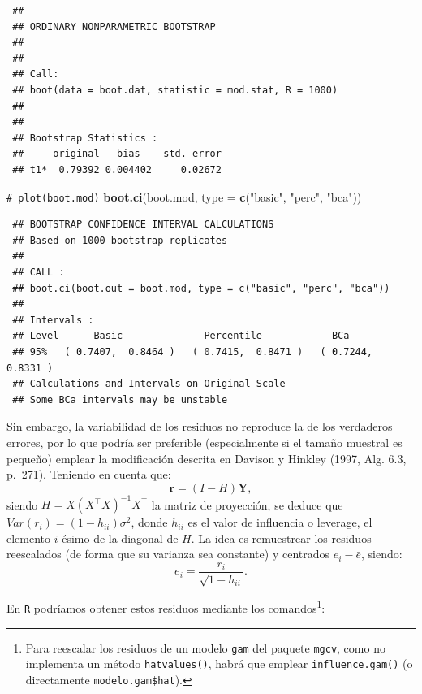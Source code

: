 \documentclass[
  spanish,
  10pt,
]{book}
\newenvironment{Shaded}{\begin{snugshade}}{\end{snugshade}}
\newcommand{\AttributeTok}[1]{\textcolor[rgb]{0.13,0.29,0.53}{#1}}
\newcommand{\CommentTok}[1]{\textcolor[rgb]{0.56,0.35,0.01}{\textit{#1}}}
\newcommand{\DecValTok}[1]{\textcolor[rgb]{0.00,0.00,0.81}{#1}}
\newcommand{\FunctionTok}[1]{\textcolor[rgb]{0.13,0.29,0.53}{\textbf{#1}}}
\newcommand{\NormalTok}[1]{#1}
\newcommand{\OtherTok}[1]{\textcolor[rgb]{0.56,0.35,0.01}{#1}}
\newcommand{\SpecialCharTok}[1]{\textcolor[rgb]{0.81,0.36,0.00}{\textbf{#1}}}
\newcommand{\StringTok}[1]{\textcolor[rgb]{0.31,0.60,0.02}{#1}}
\renewcommand{\mathbf}[1]{\symbf{#1}}
\theoremstyle{break}
\theoremstyle{nonumberplain}
\renewcommand{\CommentTok}[1]{\textcolor[rgb]{0.41,0.41,0.41}{\texttt{#1}}}
\let\oldfootnote\footnote
\renewcommand\footnote[1]{\oldfootnote{\hspace{2mm}#1}}
\begin{document}
\begin{verbatim}
 ## 
 ## ORDINARY NONPARAMETRIC BOOTSTRAP
 ## 
 ## 
 ## Call:
 ## boot(data = boot.dat, statistic = mod.stat, R = 1000)
 ## 
 ## 
 ## Bootstrap Statistics :
 ##     original   bias    std. error
 ## t1*  0.79392 0.004402     0.02672
\end{verbatim}

\begin{Shaded}
\begin{Highlighting}[]
\CommentTok{\# plot(boot.mod)}
\FunctionTok{boot.ci}\NormalTok{(boot.mod, }\AttributeTok{type =} \FunctionTok{c}\NormalTok{(}\StringTok{"basic"}\NormalTok{, }\StringTok{"perc"}\NormalTok{, }\StringTok{"bca"}\NormalTok{))}
\end{Highlighting}
\end{Shaded}

\begin{verbatim}
 ## BOOTSTRAP CONFIDENCE INTERVAL CALCULATIONS
 ## Based on 1000 bootstrap replicates
 ## 
 ## CALL : 
 ## boot.ci(boot.out = boot.mod, type = c("basic", "perc", "bca"))
 ## 
 ## Intervals : 
 ## Level      Basic              Percentile            BCa          
 ## 95%   ( 0.7407,  0.8464 )   ( 0.7415,  0.8471 )   ( 0.7244,  0.8331 )  
 ## Calculations and Intervals on Original Scale
 ## Some BCa intervals may be unstable
\end{verbatim}

Sin embargo, la variabilidad de los residuos no reproduce la de los verdaderos errores, por lo que podría ser preferible (especialmente si el tamaño muestral es pequeño) emplear la modificación descrita en Davison y Hinkley (1997, Alg. 6.3, p.~271).
Teniendo en cuenta que:
\[\mathbf{r} = \left( I - H \right)\mathbf{Y},\]
siendo \(H = X\left( X^{\top}X\right)^{-1}X^{\top}\) la matriz de proyección, se deduce que \(Var(r_i) = (1 - h_{ii})\sigma^2\), donde \(h_{ii}\) es el valor de influencia o leverage, el elemento \(i\)-ésimo de la diagonal de \(H\).
La idea es remuestrear los residuos reescalados (de forma que su varianza sea constante) y centrados \(e_i - \bar{e}\), siendo:
\[e_i = \frac{r_i}{\sqrt{1 - h_{ii}}}.\]

En \texttt{R} podríamos obtener estos residuos mediante los comandos\footnote{Para reescalar los
  residuos de un modelo \texttt{gam} del paquete \texttt{mgcv}, como no implementa un método \texttt{hatvalues()},
  habrá que emplear \texttt{influence.gam()} (o directamente \texttt{modelo.gam\$hat}).}:

\begin{Shaded}
\end{Shaded}
\end{document}
